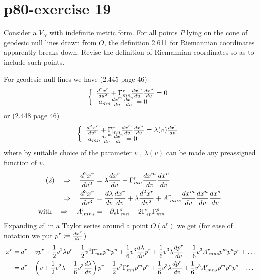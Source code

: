 \section{p80-exercise 19}
\begin{tcolorbox}
Consider a $V_N$ with indefinite metric form. For all points $P$ lying on the cone of  geodesic null lines drawn from  $O$, the definition 2.611 for Riemannian coordinates apparently breaks down. Revise the definition of Riemannian coordinates so as to include such points.
\end{tcolorbox}
For geodesic null lines we have (2.445 page 46)
\begin{align}
\left \{ \begin{array}{l}
\dv[2]{x^r}{u} + \Gamma^r_{mn}\dv{x^m}{u}\dv{x^n}{u} = 0\\
\ a_{mn}\dv{x^m}{u}\dv{x^n}{u} = 0
\end{array}\right.
\end{align}
or (2.448 page 46)
\begin{align}
\left \{ \begin{array}{l}
\dv[2]{x^r}{v} + \Gamma^r_{mn}\dv{x^m}{v}\dv{x^n}{v} = \lambda(v) \dv{x^r}{v}\\
\ a_{mn}\dv{x^m}{v}\dv{x^n}{v} = 0
\end{array}\right.
\end{align}
where by suitable choice of the parameter $v$ , $\lambda(v) $ can be made any preassigned function of $v$.
\begin{align}
\text{(2)} \quad\Rightarrow\quad \dv[2]{x^r}{v} &=   \lambda \dv{x^r}{v}-\Gamma^r_{mn}\dv{x^m}{v}\dv{x^n}{v} \\
\quad\Rightarrow\quad \dv[3]{x^r}{v} &=   \dv{\lambda }{v}\dv{x^r}{v}+ \lambda \dv[2]{x^r}{v}+ A^r_{.mns}\dv{x^m}{v}\dv{x^n}{v}\dv{x^s}{v} \\
\text{with}\quad\Rightarrow\quad A^r_{.mns} &= - \partial_s \Gamma^r_{mn} + 2 \Gamma^r_{sp}\Gamma^p_{mn}
\end{align}
Expanding $x^r$ in a Taylor series around a point $O(a^r)$ we get (for ease of notation we put $p^r \coloneqq \dv{x^r}{v}$)
\begin{align}
\ x^r &= a^r + v p^r + \frac{1}{2} v^2\lambda  p^r -  \frac{1}{2} v^2\Gamma^r_{mn}p^mp^n+\frac{1}{6}v^3\dv{\lambda  }{v}p^r + \frac{1}{6}v^3\lambda  \dv{p^r}{v} + \frac{1}{6}v^3A^r_{.mns}p^mp^np^s+\dots\\
&= a^r + \left(v  + \frac{1}{2} v^2\lambda  +\frac{1}{6}v^3\dv{\lambda  }{v}\right)p^r -  \frac{1}{2} v^2\Gamma^r_{mn}p^mp^n + \frac{1}{6}v^3\lambda  \dv{p^r}{v} + \frac{1}{6}v^3A^r_{.mns}p^mp^np^s+\dots
\end{align}
